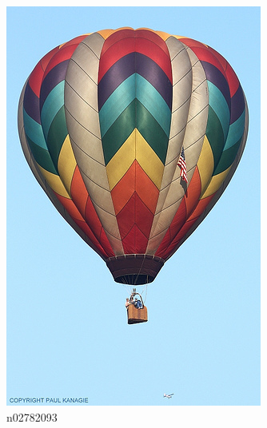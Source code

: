 \documentclass[11pt, a4paper]{article}
\begin{document}
\begin{figure}[htb]
\begin{subfigure}[b]{0.30\textwidth}
        \includegraphics[width=\textwidth]{imagenet/examples/n02782093_1001.JPEG}
        \caption{n02782093}
        \label{fig:imagenet-examples-5}
    \end{subfigure}
    ~ %
    \begin{subfigure}[b]{0.30\textwidth}
    		\centering

\end{subfigure}
\end{figure}
\end{document}
